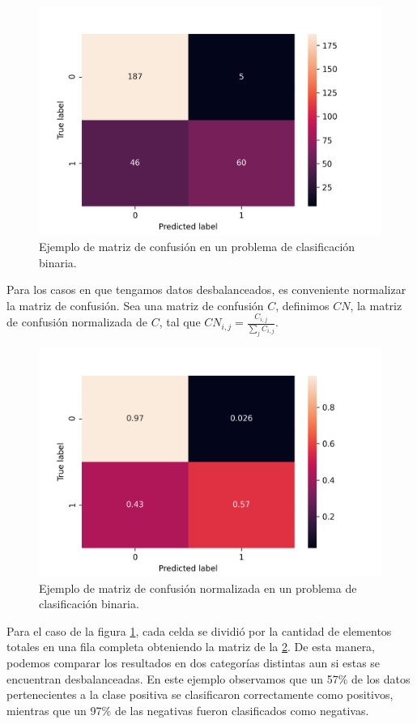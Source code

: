 \begin{figure}[h!]
    \centering
    \includegraphics[width=0.7\linewidth]{figures/cm_example_raw.png}
    \caption{Ejemplo de matriz de confusión en un problema de clasificación binaria.}
    \label{fig:cm_example_raw}
\end{figure}

Para los casos en que tengamos datos desbalanceados, es conveniente normalizar
la matriz de confusión. Sea una matriz de confusión $C$, definimos $CN$, la
matriz de confusión normalizada de $C$, tal que $CN_{i,j} =
\frac{C_{i,j}}{\sum_{j} C_{i, j}}$.

\begin{figure}[h!]
    \centering
    \includegraphics[width=0.7\linewidth]{figures/cm_example_percent.png}
    \caption{Ejemplo de matriz de confusión normalizada en un problema de clasificación binaria.}
    \label{fig:cm_example_percent}
\end{figure}

Para el caso de la figura \ref{fig:cm_example_raw}, cada celda se dividió por la
cantidad de elementos totales en una fila completa obteniendo la matriz de la
\ref{fig:cm_example_percent}. De esta manera, podemos comparar los resultados en
dos categorías distintas aun si estas se encuentran desbalanceadas. En este
ejemplo observamos que un 57\% de los datos pertenecientes a la clase positiva
se clasificaron correctamente como positivos, mientras que un 97\% de las
negativas fueron clasificados como negativas.

